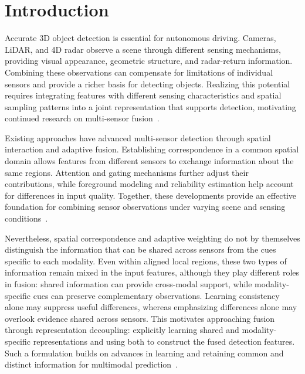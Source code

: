 
\section{Introduction}
\label{sec:introduction}

Accurate 3D object detection is essential for autonomous driving.
Cameras, LiDAR, and 4D radar observe a scene through different sensing mechanisms, providing visual appearance, geometric structure, and radar-return information.
Combining these observations can compensate for limitations of individual sensors and provide a richer basis for detecting objects.
Realizing this potential requires integrating features with different sensing characteristics and spatial sampling patterns into a joint representation that supports detection, motivating continued research on multi-sensor fusion~\citep{liu2023bevfusion,park2025mome,yue2025roburcdet}.

Existing approaches have advanced multi-sensor detection through spatial interaction and adaptive fusion.
Establishing correspondence in a common spatial domain allows features from different sensors to exchange information about the same regions.
Attention and gating mechanisms further adjust their contributions, while foreground modeling and reliability estimation help account for differences in input quality.
Together, these developments provide an effective foundation for combining sensor observations under varying scene and sensing conditions~\citep{chae2024threedlrf,huang2025l4dr,chae2025dlrfusion,paek2025asf,park2026raf}.

Nevertheless, spatial correspondence and adaptive weighting do not by themselves distinguish the information that can be shared across sensors from the cues specific to each modality.
Even within aligned local regions, these two types of information remain mixed in the input features, although they play different roles in fusion: shared information can provide cross-modal support, while modality-specific cues can preserve complementary observations.
Learning consistency alone may suppress useful differences, whereas emphasizing differences alone may overlook evidence shared across sensors.
This motivates approaching fusion through representation decoupling: explicitly learning shared and modality-specific representations and using both to construct the fused detection features.
Such a formulation builds on advances in learning and retaining common and distinct information for multimodal prediction~\citep{liang2023factorcl,liu2025featurecausality,qian2026decalign,wang2026spfd}.

